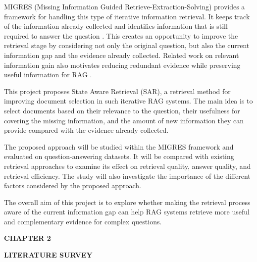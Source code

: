 \documentclass[12pt,a4paper]{report}
\newcommand{\chaptertitle}[2]{
    \begin{center}
        {\fontsize{18}{21}\selectfont\bfseries CHAPTER #1\par}
        \vspace{0.10in}
        {\fontsize{18}{21}\selectfont\bfseries #2\par}
    \end{center}
    \vspace{0.12in}
}
\begin{document}
MIGRES (Missing Information Guided Retrieve-Extraction-Solving) provides a framework for handling this type of iterative information retrieval. It keeps track of the information already collected and identifies information that is still required to answer the question \cite{wang2025migres}. This creates an opportunity to improve the retrieval stage by considering not only the original question, but also the current information gap and the evidence already collected. Related work on relevant information gain also motivates reducing redundant evidence while preserving useful information for RAG \cite{pickett2024better}.

This project proposes State Aware Retrieval (SAR), a retrieval method for improving document selection in such iterative RAG systems. The main idea is to select documents based on their relevance to the question, their usefulness for covering the missing information, and the amount of new information they can provide compared with the evidence already collected.

The proposed approach will be studied within the MIGRES framework and evaluated on question-answering datasets. It will be compared with existing retrieval approaches to examine its effect on retrieval quality, answer quality, and retrieval efficiency. The study will also investigate the importance of the different factors considered by the proposed approach.

The overall aim of this project is to explore whether making the retrieval process aware of the current information gap can help RAG systems retrieve more useful and complementary evidence for complex questions.

\clearpage




\chaptertitle{2}{LITERATURE SURVEY}
\label{ch:2}
\small
\end{document}
